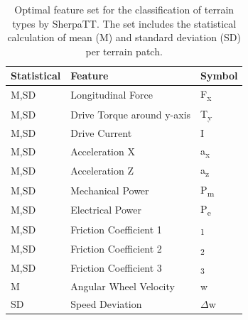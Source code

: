 \documentclass{article}
\begin{document}
\begin{table}[!htb]
   \centering
    \begin{tabularx}{\columnwidth}{XXX}
    \textbf{Statistical} & \textbf{Feature}  & \textbf{Symbol} \\
    \hline
     M,SD	&  Longitudinal Force	 & F\textsubscript{x} \\ 
     M,SD	&  Drive Torque	around y-axis  & T\textsubscript{y} \\ 
     M,SD	&  Drive Current	 & I \\  
     M,SD	&  Acceleration X	 &  a\textsubscript{x}\\ 
     M,SD	&  Acceleration Z	 & a\textsubscript{z} \\ 
     M,SD	&  Mechanical Power	 & P\textsubscript{m} \\ 
     M,SD	&  Electrical Power	 & P\textsubscript{e} \\ 
     M,SD	&  Friction Coefficient 1	 & \textmu \textsubscript{1} \\ 
     M,SD	&  Friction Coefficient 2 & \textmu \textsubscript{2}\\ 
     M,SD	&  Friction Coefficient 3	 & \textmu \textsubscript{3}\\ 
     M	    &  Angular Wheel Velocity	     &  w      \\ 
     SD    	&  Speed Deviation	 & $\Delta$w\\ 
    \end{tabularx}	
    \caption{Optimal feature set for the classification of terrain types by SherpaTT. The set includes the statistical calculation of mean (M) and standard deviation (SD) per terrain patch.\label{table:features2}}
\end{table}

%
%
\end{document}
